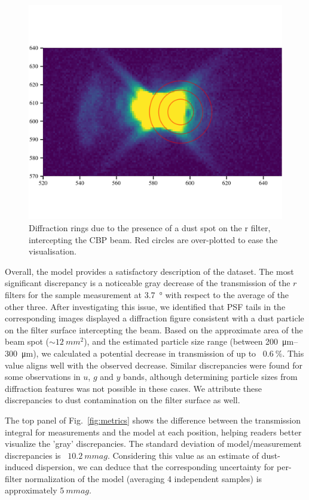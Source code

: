 \begin{figure}
  \centering
  \includegraphics[width=1\linewidth]{fig/diffraction_dust.png}
  \caption{Diffraction rings due to the presence of a dust spot on the
    r filter, intercepting the CBP beam. Red circles are over-plotted
    to ease the visualisation.}
  \label{fig:dust}
\end{figure}


Overall, the model provides a satisfactory description of the
dataset. The most significant discrepancy is a noticeable gray
decrease of the transmission of the $r$ filters for the sample
measurement at \SI{3.7}{\degree} with respect to the average of the
other three.  After investigating this issue, we identified that PSF
tails in the corresponding images displayed a diffraction figure
consistent with a dust particle on the filter surface intercepting the
beam. Based on the approximate area of the beam spot
($\sim\SI{12}{mm^2}$), and the estimated particle size range (between
\SIrange{200}{300}{\micro\metre}), we calculated a potential decrease
in transmission of up to ~$\SI{0.6}{\percent}$. This value aligns well
with the observed decrease. Similar discrepancies were found for some
observations in $u$, $g$ and $y$ bands, although determining particle
sizes from diffraction features was not possible in these cases. We
attribute these discrepancies to dust contamination on the filter
surface as well.

The top panel of Fig.~\ref{fig:metrics} shows the difference between
the transmission integral for measurements and the model at each
position, helping readers better visualize the 'gray'
discrepancies. The standard deviation of model/measurement
discrepancies is ~$\SI{10.2}{mmag}$. Considering this value as an
estimate of dust-induced dispersion, we can deduce that the
corresponding uncertainty for per-filter normalization of the model
(averaging 4 independent samples) is approximately $\SI{5}{mmag}$.

